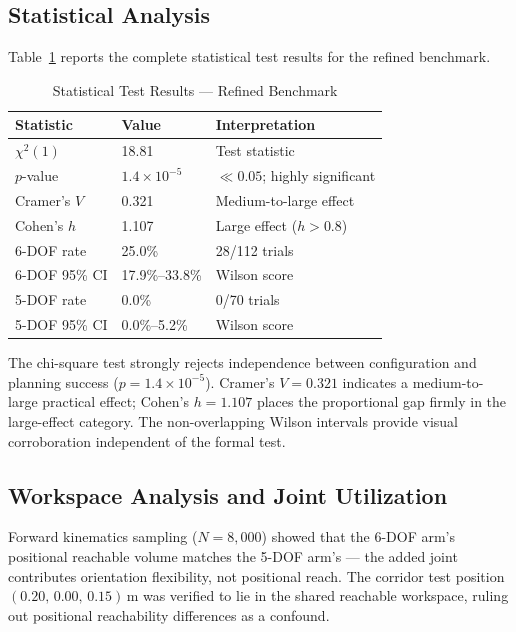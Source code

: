\documentclass[conference]{IEEEtran}
\begin{document}
	\subsection{Statistical Analysis}
	
	Table~\ref{tab:stats} reports the complete statistical test results
	for the refined benchmark.
	
	\begin{table}[t]
		\centering
		\caption{Statistical Test Results --- Refined Benchmark}
		\label{tab:stats}
		\renewcommand{\arraystretch}{1.2}
		\small
		\begin{tabular}{lll}
			\toprule
			\textbf{Statistic} & \textbf{Value} & \textbf{Interpretation} \\
			\midrule
			$\chi^2(1)$   & 18.81              & Test statistic \\
			$p$-value     & $1.4\times10^{-5}$ & $\ll 0.05$; highly significant \\
			Cramer's $V$  & 0.321              & Medium-to-large effect \\
			Cohen's $h$   & 1.107              & Large effect ($h > 0.8$) \\
			6-DOF rate    & 25.0\%             & 28/112 trials \\
			6-DOF 95\% CI & 17.9\%--33.8\%     & Wilson score \\
			5-DOF rate    & 0.0\%              & 0/70 trials \\
			5-DOF 95\% CI & 0.0\%--5.2\%       & Wilson score \\
			\bottomrule
		\end{tabular}
	\end{table}
	
	The chi-square test strongly rejects independence between configuration
	and planning success ($p = 1.4\times10^{-5}$). Cramer's $V = 0.321$
	indicates a medium-to-large practical effect; Cohen's $h = 1.107$
	places the proportional gap firmly in the large-effect category. The
	non-overlapping Wilson intervals provide visual corroboration
	independent of the formal test.
	
	\subsection{Workspace Analysis and Joint Utilization}
	
	Forward kinematics sampling ($N = 8{,}000$) showed that the 6-DOF
	arm's positional reachable volume matches the 5-DOF arm's --- the
	added joint contributes orientation flexibility, not positional reach.
	The corridor test position $(0.20,\,0.00,\,0.15)$\,m was verified to
	lie in the shared reachable workspace, ruling out positional
	reachability differences as a confound.
	
\end{document}
